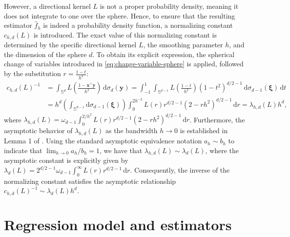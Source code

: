 \documentclass[12pt]{report} %
\newcommand{\bx}{\mathbf{x}}
\newcommand{\by}{\mathbf{y}}
\newcommand{\sigmad}{\sigma_{d}}
\newcommand{\sigmadm}{\sigma_{d-1}}
\newcommand{\rd}{\mathrm{d}}
\newcommand{\Sdm}{\mathbb{S}^{d-1}}
\begin{document}
However, a directional kernel $L$ is not a proper probability density, meaning it does not integrate to one over the sphere. Hence, to ensure that the resulting estimator $\hat{f}_h$ is indeed a probability density function, a normalizing constant $c_{h,d}(L)$ is introduced. The exact value of this normalizing constant is determined by the specific directional kernel $L$, the smoothing parameter $h$, and the dimension of the sphere $d$. To obtain its explicit expression, the spherical change of variables introduced in \eqref{eq:change-variable-sphere} is applied, followed by the substitution $r = \frac{1 - t}{h^2}$:
\begin{align*}
    c_{h,d}(L)^{-1} &= \int_{\mathbb{S}^d} L\left(\frac{1 - \bx^\top\by}{h^2}\right) \,\rd\sigmad(\by) 
    = \int_{-1}^1 \int_{\Sdm} L\left(\frac{1 - t}{h^2}\right) (1-t^2)^{d/2-1} \,\rd\sigmadm(\boldsymbol{\xi}) \,\rd t \\
    &= h^d \left( \int_{\Sdm} \rd\sigmadm(\boldsymbol{\xi}) \right) \int_{0}^{2h^{-2}} L(r) r^{d/2-1} (2 - r h^2)^{d/2-1} \,\rd r 
    = \lambda_{h,d}(L) h^d,
\end{align*}
where $\lambda_{h,d}(L) = \omega_{d-1} \int_{0}^{2/h^2} L(r) r^{d/2-1} (2 - rh^2)^{d/2-1} \,\rd r$. Furthermore, the asymptotic behavior of $\lambda_{h,d}(L)$ as the bandwidth $h \to 0$ is established in Lemma 1 of \citep{Garcia-Portugues2013b}. Using the standard asymptotic equivalence notation $a_h \sim b_h$ to indicate that $\lim_{h \to 0} a_h / b_h = 1$, we have that $\lambda_{h,d}(L) \sim \lambda_d(L)$, where the asymptotic constant is explicitly given by $\lambda_d(L) = 2^{d/2-1} \omega_{d-1} \int_{0}^{\infty} L(r)r^{d/2-1} \,\rd r$. Consequently, the inverse of the normalizing constant satisfies the asymptotic relationship $c_{h,d}(L)^{-1} \sim \lambda_d(L)h^d$.

\section{Regression model and estimators}
\end{document}
